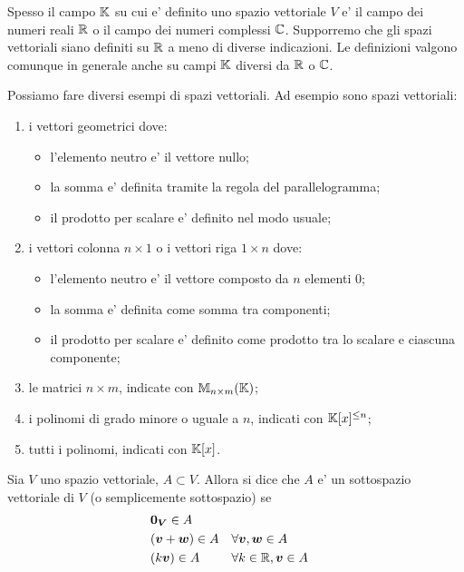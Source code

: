 Spesso il campo $\mathbb{K}$ su cui e' definito uno spazio vettoriale $V$ e' il campo dei numeri reali $\mathbb{R}$ o il campo dei numeri complessi $\mathbb{C}$. Supporremo che gli spazi vettoriali siano definiti su $\mathbb{R}$ a meno di diverse indicazioni. Le definizioni valgono comunque in generale anche su campi $\mathbb{K}$ diversi da $\mathbb{R}$ o $\mathbb{C}$.

\begin{example}
    Possiamo fare diversi esempi di spazi vettoriali. Ad esempio sono spazi vettoriali:
    \begin{enumerate}
        \item i vettori geometrici dove:
        \begin{itemize}
            \item l'elemento neutro e' il vettore nullo;
            \item la somma e' definita tramite la regola del parallelogramma;
            \item il prodotto per scalare e' definito nel modo usuale;
        \end{itemize}
        \item i vettori colonna $n \times 1$ o i vettori riga $1 \times n$ dove:
        \begin{itemize}
            \item l'elemento neutro e' il vettore composto da $n$ elementi $0$;
            \item la somma e' definita come somma tra componenti;
            \item il prodotto per scalare e' definito come prodotto tra lo scalare e ciascuna componente;
        \end{itemize}
        \item le matrici $n \times m$, indicate con $\mathbb{M}_{n \times m}(\mathbb{K})$;
        \item i polinomi di grado minore o uguale a $n$, indicati con $\mathbb{K}[x]^{\leq n}$;
        \item tutti i polinomi, indicati con $\mathbb{K}[x]$.
    \end{enumerate}
\end{example}

\begin{definition}
    Sia $V$ uno spazio vettoriale, $A \subset V$. Allora si dice che $A$ e' un sottospazio vettoriale di $V$ (o semplicemente sottospazio) se
    \begin{align}
        &\bm{0_V} \in A \\
        &(\bm{v} + \bm{w}) \in A    &&\forall \bm{v}, \bm{w} \in A \\
        &(k\bm{v}) \in A            &&\forall k \in \mathbb{R}, \bm{v} \in A
    \end{align}
\end{definition}

